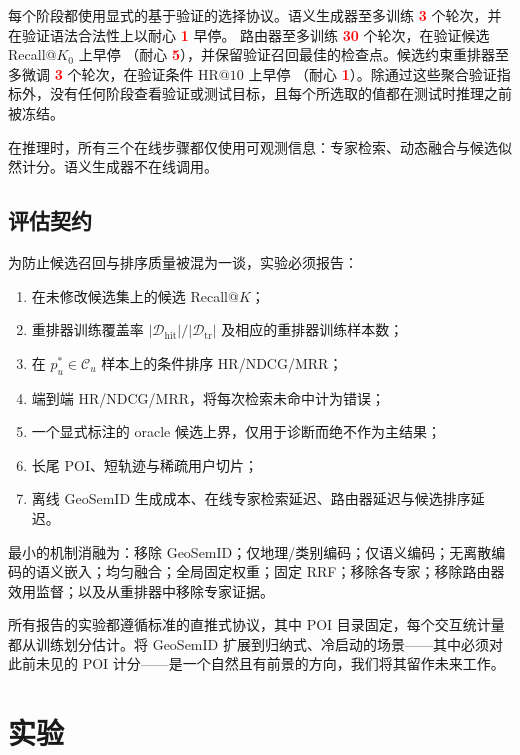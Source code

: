 \documentclass[10pt,fontset=none,twocolumn]{ctexart}
\newcommand{\mock}[1]{\textbf{\textcolor{red}{#1}}}
\begin{document}
每个阶段都使用显式的基于验证的选择协议。语义生成器至多训练 \mock{3} 个轮次，并在验证语法合法性上以耐心 \mock{1} 早停。
路由器至多训练 \mock{30} 个轮次，在验证候选 Recall@$K_0$ 上早停
（耐心 \mock{5}），并保留验证召回最佳的检查点。候选约束重排器至多微调 \mock{3} 个轮次，在验证条件 HR@$10$ 上早停
（耐心 \mock{1}）。除通过这些聚合验证指标外，没有任何阶段查看验证或测试目标，且每个所选取的值都在测试时推理之前被冻结。

在推理时，所有三个在线步骤都仅使用可观测信息：专家检索、动态融合与候选似然计分。语义生成器不在线调用。

\subsection{评估契约}
\label{subsec:evaluation_contract}

为防止候选召回与排序质量被混为一谈，实验必须报告：
\begin{enumerate}[leftmargin=*,nosep]
\item 在未修改候选集上的候选 Recall@$K$；
\item 重排器训练覆盖率 $|\mathcal{D}_{\mathrm{hit}}|/|\mathcal{D}_{\mathrm{tr}}|$ 及相应的重排器训练样本数；
\item 在 $p_u^{*}\in\mathcal{C}_u$ 样本上的条件排序 HR/NDCG/MRR；
\item 端到端 HR/NDCG/MRR，将每次检索未命中计为错误；
\item 一个显式标注的 oracle 候选上界，仅用于诊断而绝不作为主结果；
\item 长尾 POI、短轨迹与稀疏用户切片；
\item 离线 GeoSemID 生成成本、在线专家检索延迟、路由器延迟与候选排序延迟。
\end{enumerate}

最小的机制消融为：移除 GeoSemID；仅地理/类别编码；仅语义编码；无离散编码的语义嵌入；均匀融合；全局固定权重；固定 RRF；移除各专家；移除路由器效用监督；以及从重排器中移除专家证据。

所有报告的实验都遵循标准的直推式协议，其中 POI 目录固定，每个交互统计量都从训练划分估计。将 GeoSemID 扩展到归纳式、冷启动的场景——其中必须对此前未见的 POI 计分——是一个自然且有前景的方向，我们将其留作未来工作。

\section{实验}
\label{sec:experiments}
\end{document}
